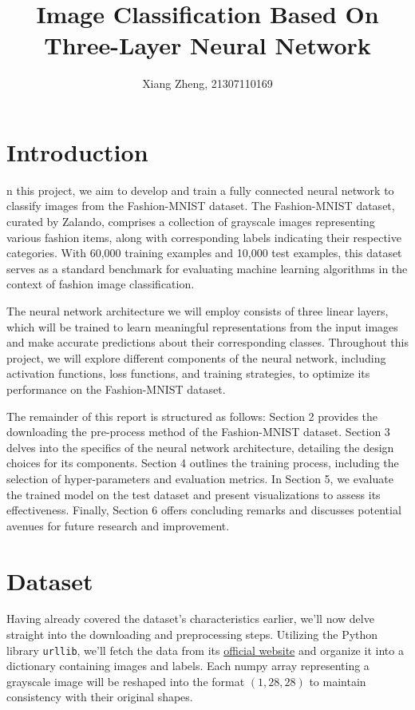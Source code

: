 \documentclass[10pt,a4paper,twoside]{tau}
\title{Image Classification Based On Three-Layer Neural Network}
\author[]{Xiang Zheng, 21307110169}
\affil[]{School of Data Science, Fudan University}
\date{}
\begin{document}
		
\maketitle
\thispagestyle{firststyle}
\tauabstract

\section{Introduction}

n this project, we aim to develop and train a fully connected neural network to classify images from the Fashion-MNIST dataset. The Fashion-MNIST dataset, curated by Zalando, comprises a collection of grayscale images representing various fashion items, along with corresponding labels indicating their respective categories. With 60,000 training examples and 10,000 test examples, this dataset serves as a standard benchmark for evaluating machine learning algorithms in the context of fashion image classification.

The neural network architecture we will employ consists of three linear layers, which will be trained to learn meaningful representations from the input images and make accurate predictions about their corresponding classes. Throughout this project, we will explore different components of the neural network, including activation functions, loss functions, and training strategies, to optimize its performance on the Fashion-MNIST dataset.

The remainder of this report is structured as follows: Section 2 provides the downloading the pre-process method of the Fashion-MNIST dataset. Section 3 delves into the specifics of the neural network architecture, detailing the design choices for its components. Section 4 outlines the training process, including the selection of hyper-parameters and evaluation metrics. In Section 5, we evaluate the trained model on the test dataset and present visualizations to assess its effectiveness. Finally, Section 6 offers concluding remarks and discusses potential avenues for future research and improvement.

\section{Dataset}

Having already covered the dataset's characteristics earlier, we'll now delve straight into the downloading and preprocessing steps. Utilizing the Python library \texttt{urllib}, we'll fetch the data from its \href{https://github.com/zalandoresearch/fashion-mnist}{official website} and organize it into a dictionary containing images and labels. Each numpy array representing a grayscale image will be reshaped into the format $(1, 28, 28)$ to maintain consistency with their original shapes.
\end{document}
